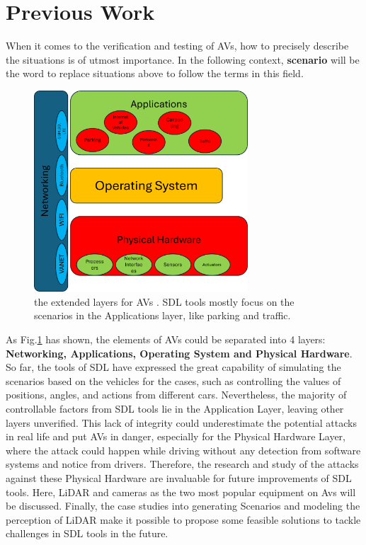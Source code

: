 \documentclass[conference]{IEEEtran}
\begin{document}
\section{Previous Work}
\label{sec: PW}
When it comes to the verification and testing of AVs, how to precisely describe the situations is of utmost importance. In the following context, \textbf{scenario} will be the word to replace situations above to follow the terms in this field.
\begin{figure}[htbp]
\centerline{\includegraphics[width=80mm,scale=0.5]{./pic/pic1_layers.png}}
\caption{the extended layers for AVs \cite{b7}. SDL tools mostly focus on the scenarios in the Applications layer, like parking and traffic.}
\label{fig1}
\end{figure}
As Fig.\ref{fig1} has shown, the elements of AVs could be separated into 4 layers: \textbf{Networking, Applications, Operating System and Physical Hardware}. 
So far, the tools of SDL have expressed the great capability of simulating the scenarios based on the vehicles for the cases, such as controlling the values of positions, angles, and actions from different cars. Nevertheless, the majority of controllable factors from SDL tools lie in the Application Layer, leaving other layers unverified. This lack of integrity could underestimate the potential attacks in real life and put  AVs in danger, especially for the Physical Hardware Layer, where the attack could happen while driving without any detection from software systems and notice from drivers. Therefore, the research and study of the attacks against these Physical Hardware are invaluable for future improvements of SDL tools. Here, LiDAR and cameras as the two most popular equipment on Avs will be discussed. Finally, the case studies into generating Scenarios and modeling the perception of LiDAR make it possible to propose some feasible solutions to tackle challenges in SDL tools in the future.
\end{document}
